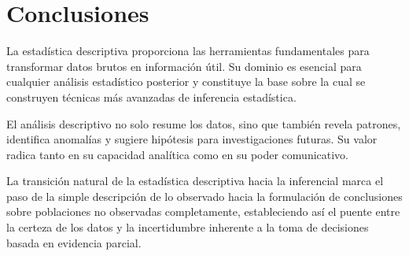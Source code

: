 \section{Conclusiones}

La estadística descriptiva proporciona las herramientas fundamentales para transformar datos brutos en información útil. Su dominio es esencial para cualquier análisis estadístico posterior y constituye la base sobre la cual se construyen técnicas más avanzadas de inferencia estadística.

\begin{remark}
El análisis descriptivo no solo resume los datos, sino que también revela patrones, identifica anomalías y sugiere hipótesis para investigaciones futuras. Su valor radica tanto en su capacidad analítica como en su poder comunicativo.
\end{remark}

La transición natural de la estadística descriptiva hacia la inferencial marca el paso de la simple descripción de lo observado hacia la formulación de conclusiones sobre poblaciones no observadas completamente, estableciendo así el puente entre la certeza de los datos y la incertidumbre inherente a la toma de decisiones basada en evidencia parcial.

